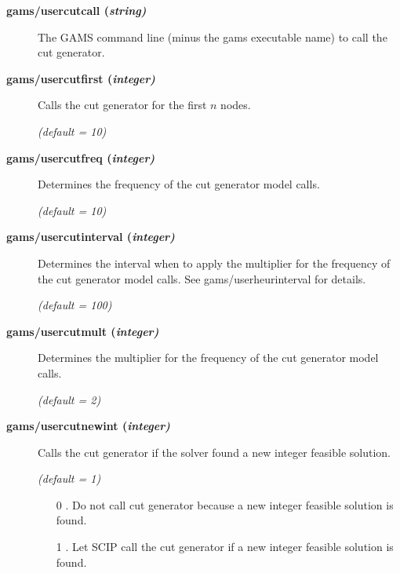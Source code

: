 \begin{description}
\item[\label{scipusercutcall}\hypertarget{scipusercutcall}
{\textbf{gams/usercutcall (\slshape{string})}}]\hspace{1.0in}

The GAMS command line (minus the gams executable name) to call the cut generator.


\item[\label{scipusercutfirst}\hypertarget{scipusercutfirst}
{\textbf{gams/usercutfirst (\slshape{integer})}}]\hspace{1.0in}

Calls the cut generator for the first $n$ nodes.

\textsl{(default = 10)}

\item[\label{scipusercutfreq}\hypertarget{scipusercutfreq}
{\textbf{gams/usercutfreq (\slshape{integer})}}]\hspace{1.0in}

Determines the frequency of the cut generator model calls.

\textsl{(default = 10)}

\item[\label{scipusercutinterval}\hypertarget{scipusercutinterval}
{\textbf{gams/usercutinterval (\slshape{integer})}}]\hspace{1.0in}

Determines the interval when to apply the multiplier for the frequency of the cut generator model calls.
See gams/userheurinterval for details.

\textsl{(default = 100)}

\item[\label{scipusercutmult}\hypertarget{scipusercutmult}
{\textbf{gams/usercutmult (\slshape{integer})}}]\hspace{1.0in}

Determines the multiplier for the frequency of the cut generator model calls.

\textsl{(default = 2)}

\item[\label{scipusercutnewint}\hypertarget{scipusercutnewint}
{\textbf{gams/usercutnewint (\slshape{integer})}}]\hspace{1.0in}

Calls the cut generator if the solver found a new integer feasible solution.

\textsl{(default = 1)}
\begin{itemize}
\item[0] .
Do not call cut generator because a new integer feasible solution is found.
\item[1] .
Let SCIP call the cut generator if a new integer feasible solution is found.
\end{itemize}


\end{description}
